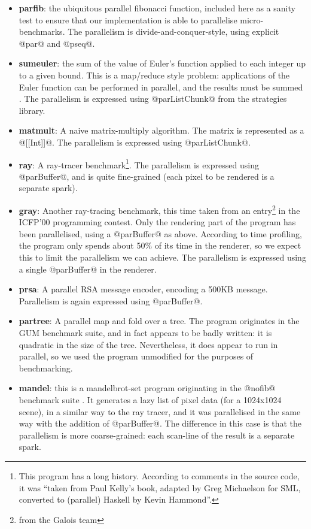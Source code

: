 \documentclass[twocolumn,9pt]{sigplanconf}
\begin{document}
\begin{itemize}
\item \textbf{parfib}: the ubiquitous parallel fibonacci function,
  included here as a sanity test to ensure that our implementation is
  able to parallelise micro-benchmarks.  The parallelism is
  divide-and-conquer-style, using explicit @par@ and @pseq@.
\item \textbf{sumeuler}: the sum of the value of Euler's function
  applied to each integer up to a given bound.  This is a map/reduce
  style problem: applications of the Euler function can be performed
  in parallel, and the results must be summed
  \cite{trinder:parallel}.  The parallelism is expressed using
  @parListChunk@ from the strategies library.
\item \textbf{matmult}: A naive matrix-multiply algorithm.  The matrix
  is represented as a @[[Int]]@.  The parallelism is expressed using
  @parListChunk@.
\item \textbf{ray}: A ray-tracer benchmark\footnote{This program has a
  long history. According to comments in the source code, it was
  ``taken from Paul Kelly's book, adapted by Greg Michaelson for SML,
  converted to (parallel) Haskell by Kevin Hammond''.}.  The
  parallelism is expressed using @parBuffer@, and is quite
  fine-grained (each pixel to be rendered is a separate spark).
\item \textbf{gray}: Another ray-tracing benchmark, this time taken
  from an entry\footnote{from the Galois team} in the ICFP'00
  programming contest.  Only the rendering part of the program has
  been parallelised, using a @parBuffer@ as above.  According to time
  profiling, the program only spends about 50\% of its time in the
  renderer, so we expect this to limit the parallelism we can achieve.
  The parallelism is expressed using a single @parBuffer@ in the
  renderer.
\item \textbf{prsa}: A parallel RSA message encoder, encoding a 500KB
  message.  Parallelism is again expressed using @parBuffer@.
\item \textbf{partree}: A parallel map and fold over a tree.  The
  program originates in the GUM benchmark suite, and in fact appears
  to be badly written: it is quadratic in the size of the tree.
  Nevertheless, it does appear to run in parallel, so we used the
  program unmodified for the purposes of benchmarking.
\item \textbf{mandel}: this is a mandelbrot-set program originating in
  the @nofib@ benchmark suite \cite{partain:nofib}.  It generates a lazy list
  of pixel data (for a 1024x1024 scene), in a similar way to the ray
  tracer, and it was parallelised in the same way with the addition of
  @parBuffer@.  The difference in this case is that the parallelism is
  more coarse-grained: each scan-line of the result is a separate
  spark.
\end{itemize}
\end{document}
